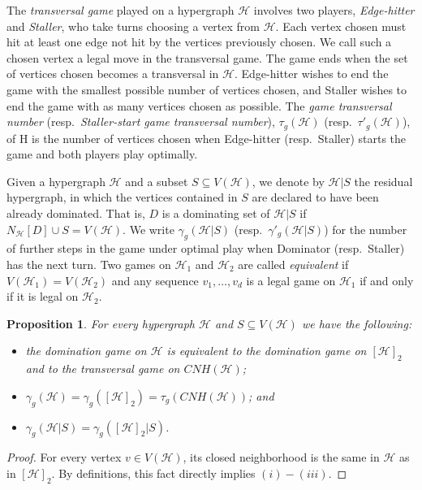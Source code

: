 \documentclass[12pt]{article}
\newtheorem{prop}[theorem]{Proposition}
\newcommand\cH{{\mathcal H}}
\begin{document}
\vspace{2mm}

The \textit{transversal game} played on a hypergraph $\cH$ involves two players, \textit{Edge-hitter} and \textit{Staller}, who take turns choosing a vertex from $\cH$. Each vertex chosen must hit at least
one edge not hit by the vertices previously chosen. We call such a chosen vertex a legal
move in the transversal game. The game ends when the set of vertices chosen becomes a
transversal in $\cH$. Edge-hitter wishes to end the game with the smallest possible number of 
vertices chosen, and Staller wishes to end the game with as many vertices chosen as possible.
The \textit{game transversal number} (resp.\ \textit{Staller-start game transversal number}), $\tau_g(\cH)$ (resp.\
$\tau'_g(\cH)$), of H is the number of vertices chosen when Edge-hitter (resp.\ Staller) starts the
game and both players play optimally.

\vspace{2mm}

Given a hypergraph $\cH$ and a subset $S \subseteq V(\cH)$, we denote by $\cH|S$ the residual hypergraph, in which the vertices contained in $S$ are declared to have been already dominated. That is, $D$ is a dominating set of $\cH|S$ if $N_\cH[D] \cup S=V(\cH)$. We write $\gamma_g(\cH|S)$
(resp.\ $\gamma'_g(\cH|S)$) for the number of further steps in the game
under optimal play when Dominator (resp.\ Staller) has the next turn.
Two games on $\cH_1$ and $\cH_2$ are called \textit{equivalent} if $V(\cH_1)=V(\cH_2)$ and any sequence  $v_1,\dots, v_d$ is a legal game on $\cH_1$ if and only if it is legal on $\cH_2$.


\begin{prop} \label{equiv1}
For every hypergraph $\cH$ and $S \subseteq V(\cH)$ we have the following:
\begin{itemize}
\item[$(i)$] the domination game on $\cH$ is equivalent to the domination game on $[\cH]_2$ and to the transversal game on $CNH(\cH)$;
\item[$(ii)$] $\gamma_g(\cH)=\gamma_g([\cH]_2)=\tau_g(CNH(\cH))$; and
\item[$(iii)$] $\gamma_g(\cH|S)=\gamma_g([\cH]_2|S)$.
\end{itemize}
\end{prop}

\begin{proof} For every vertex $v \in V(\cH)$, its closed neighborhood is the same in $\cH$ as in $[\cH]_2$. By definitions, this fact directly implies $(i)-(iii)$.
\end{proof}
\end{document}
